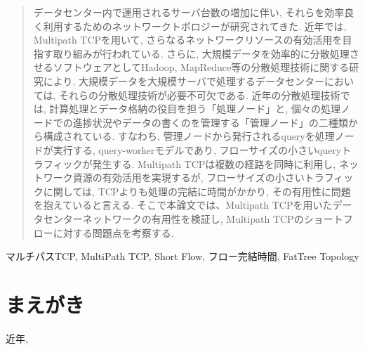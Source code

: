 \documentclass{ieicej}
\begin{document}
\begin{abstract}
データセンター内で運用されるサーバ台数の増加に伴い, それらを効率良く利用するためのネットワークトポロジーが研究されてきた.
近年では, Multipath TCPを用いて, さらなるネットワークリソースの有効活用を目指す取り組みが行われている.
さらに, 大規模データを効率的に分散処理させるソフトウェアとしてHadoop, MapReduce等の分散処理技術に関する研究により,
大規模データを大規模サーバで処理するデータセンターにおいては, それらの分散処理技術が必要不可欠である.
近年の分散処理技術では, 計算処理とデータ格納の役目を担う「処理ノード」と,
個々の処理ノードでの進捗状況やデータの書くのを管理する「管理ノード」の二種類から構成されている.
すなわち, 管理ノードから発行されるqueryを処理ノードが実行する, query-workerモデルであり,
フローサイズの小さいqueryトラフィックが発生する.
Multipath TCPは複数の経路を同時に利用し, ネットワーク資源の有効活用を実現するが,
フローサイズの小さいトラフィックに関しては,
TCPよりも処理の完結に時間がかかり, その有用性に問題を抱えていると言える.
そこで本論文では、Multipath TCPを用いたデータセンターネットワークの有用性を検証し, Multipath
TCPのショートフローに対する問題点を考察する.
\end{abstract}
\begin{keyword}
マルチパスTCP, MultiPath TCP, Short Flow, フロー完結時間, FatTree Topology
\end{keyword}
\maketitle

\section{まえがき}
\label{sec:intro}

近年,
\end{document}
